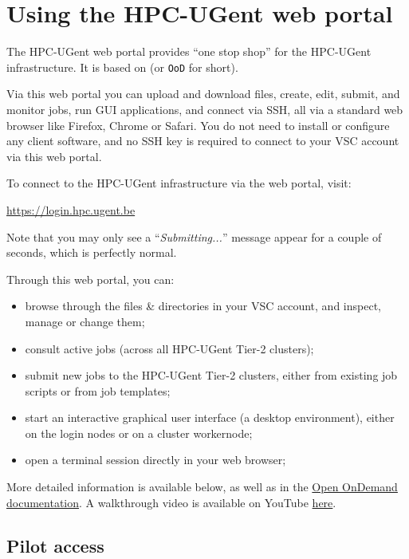 \chapter{Using the HPC-UGent web portal}
\label{ch:web_portal}

The HPC-UGent web portal provides ``one stop shop'' for the HPC-UGent infrastructure.
It is based on \href{https://openondemand.org/}{} (or \texttt{OoD} for short).

Via this web portal you can upload and download files, create, edit, submit, and monitor jobs,
run GUI applications, and connect via SSH, all via a standard web browser like Firefox, Chrome
or Safari. You do not need to install or configure any client software,
and no SSH key is required to connect to your VSC account via this web portal.

To connect to the HPC-UGent infrastructure via the web portal, visit:

\begin{center}\url{https://login.hpc.ugent.be}\end{center}

Note that you may only see a ``\emph{Submitting...}'' message appear for a couple of seconds,
which is perfectly normal.

Through this web portal, you can:
\begin{itemize}
    \item browse through the files \& directories in your VSC account, and inspect, manage or change them;
    \item consult active jobs (across all HPC-UGent Tier-2 clusters);
    \item submit new jobs to the HPC-UGent Tier-2 clusters, either from existing job scripts or from job templates;
    \item start an interactive graphical user interface (a desktop environment), either on the login nodes or on a cluster workernode;
    \item open a terminal session directly in your web browser;
\end{itemize}

More detailed information is available below, as well as in the \href{https://osc.github.io/ood-documentation/master/}{Open OnDemand documentation}.
A walkthrough video is available on YouTube \href{https://www.youtube.com/watch?v=4-w-4wjlnPk}{here}.

\section*{Pilot access}

